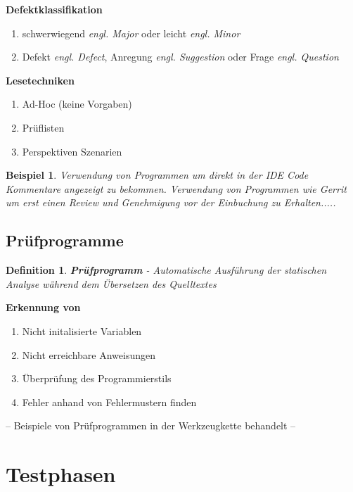\documentclass[a4paper]{article}
\theoremstyle{break}
\newtheorem{defi}{Definition}[section]
\newtheorem{ex}{Beispiel}[section]
\begin{document}
          \textbf{Defektklassifikation}
          \begin{enumerate}
          \item schwerwiegend \textit{engl. Major} oder leicht \textit{engl. Minor}
            \item Defekt \textit{engl. Defect}, Anregung \textit{engl. Suggestion} oder Frage \textit{engl. Question}
          \end{enumerate}

          \textbf{Lesetechniken}
          \begin{enumerate}
          \item Ad-Hoc (keine Vorgaben)
          \item Pr\"uflisten
          \item Perspektiven Szenarien
          \end{enumerate}

          \begin{ex}
            Verwendung von Programmen um direkt in der IDE Code Kommentare angezeigt zu bekommen.
            Verwendung von Programmen wie Gerrit um erst einen Review und Genehmigung vor der Einbuchung zu Erhalten.....
          \end{ex}
          
          \subsection{Prüfprogramme}

          \begin{defi}
            \textbf{Pr\"ufprogramm} - Automatische Ausf\"uhrung der statischen Analyse w\"ahrend dem \"Ubersetzen des Quelltextes
          \end{defi}

          \textbf{Erkennung von}
          \begin{enumerate}
          \item Nicht initalisierte Variablen
          \item Nicht erreichbare Anweisungen
          \item Überprüfung des Programmierstils
          \item Fehler anhand von Fehlermustern finden
          \end{enumerate}

          -- Beispiele von Prüfprogrammen in der Werkzeugkette behandelt --
          
          \section{Testphasen}
          
\end{document}
